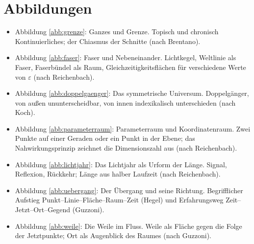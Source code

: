 \chapter{Abbildungen}

\begin{itemize}
\item Abbildung \ref{abb:grenze}: Ganzes und Grenze. Topisch und chronisch Kontinuierliches; der Chiasmus der Schnitte (nach Brentano).
\item Abbildung \ref{abb:faser}: Faser und Nebeneinander. Lichtkegel, Weltlinie als Faser, Faserbündel als Raum, Gleichzeitigkeitsflächen für verschiedene Werte von $\varepsilon$ (nach Reichenbach).
\item Abbildung \ref{abb:doppelgaenger}: Das symmetrische Universum. Doppelgänger, von außen ununterscheidbar, von innen indexikalisch unterschieden (nach Koch).
\item Abbildung \ref{abb:parameterraum}: Parameterraum und Koordinatenraum. Zwei Punkte auf einer Geraden oder ein Punkt in der Ebene; das Nahwirkungsprinzip zeichnet die Dimensionszahl aus (nach Reichenbach).
\item Abbildung \ref{abb:lichtjahr}: Das Lichtjahr als Urform der Länge. Signal, Reflexion, Rückkehr; Länge aus halber Laufzeit (nach Reichenbach).
\item Abbildung \ref{abb:uebergang}: Der Übergang und seine Richtung. Begrifflicher Aufstieg Punkt--Linie--Fläche--Raum--Zeit (Hegel) und Erfahrungsweg Zeit--Jetzt--Ort--Gegend (Guzzoni).
\item Abbildung \ref{abb:weile}: Die Weile im Fluss. Weile als Fläche gegen die Folge der Jetztpunkte; Ort als Augenblick des Raumes (nach Guzzoni).
\end{itemize}
